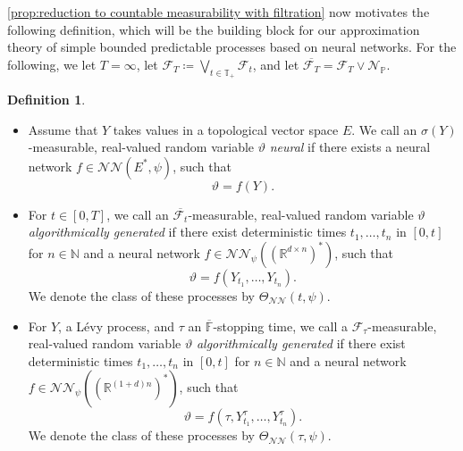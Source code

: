 \documentclass[11pt,a4paper,twoside,openany]{report}
\theoremstyle{plain} %
\theoremstyle{definition} %
\newtheorem{definition}[definition]{Definition}
\theoremstyle{remark} %
\begin{document}
\cref{prop:reduction to countable measurability with filtration} now motivates the following definition, which will be the building block for our approximation theory of simple bounded predictable processes based on neural networks. For the following, we let \(T=\infty\), let \(\mathcal{F}_{T}\coloneqq\bigvee_{t\in\mathbb{T}_+}\mathcal{F}_t\), and let \(\overline{\mathcal{F}_{T}}=\mathcal{F}_{T}\vee \mathcal{N}_{\mathbb{P}}\).
\begin{definition}\label{def:algorithmic strategies}
    \begin{itemize}
        \item Assume that \(Y\) takes values in a topological vector space \(E\). We call an \(\sigma(Y)\)-measurable, real-valued random variable \(\vartheta\) \textit{neural} if there exists a neural network \(f\in\mathcal{NN}(E^*,\psi)\), such that 
        \begin{equation}
            \vartheta = f(Y).
        \end{equation}
        \item For \(t\in[0,T]\), we call an \(\overline{\mathcal{F}_t}\)-measurable, real-valued random variable \(\vartheta\) \textit{algorithmically generated} if there exist deterministic times 
        \(t_1,\dots,t_n\) in \([0,t]\) for \(n\in\mathbb{N}\) and a neural network \(f\in\mathcal{NN}_\psi((\mathbb{R}^{d\times n})^*)\), such that
        \begin{equation}
            \vartheta = f(Y_{t_1},\dots,Y_{t_n}).
        \end{equation}
        We denote the class of these processes by \(\Theta_{\mathcal{NN}}(t,\psi)\). 
        \item
        For \(Y\), a Lévy process, and \(\tau\) an \(\overline{\mathbb{F}}\)-stopping time, we call a \(\mathcal{F}_{\tau}\)-measurable, real-valued random variable \(\vartheta\) \textit{algorithmically generated} if there exist deterministic times 
        \(t_1,\dots,t_n\) in \([0,t]\) for \(n\in\mathbb{N}\) and a neural network \(f\in\mathcal{NN}_\psi((\mathbb{R}^{(1+d)n})^*)\), such that
        \begin{equation}
            \vartheta = f(\tau,Y^{\tau}_{t_1},\dots,Y^{\tau}_{t_n}).
        \end{equation}
        We denote the class of these processes by \(\Theta_{\mathcal{NN}}(\tau,\psi)\). 
    \end{itemize}
\end{definition}
\end{document}
